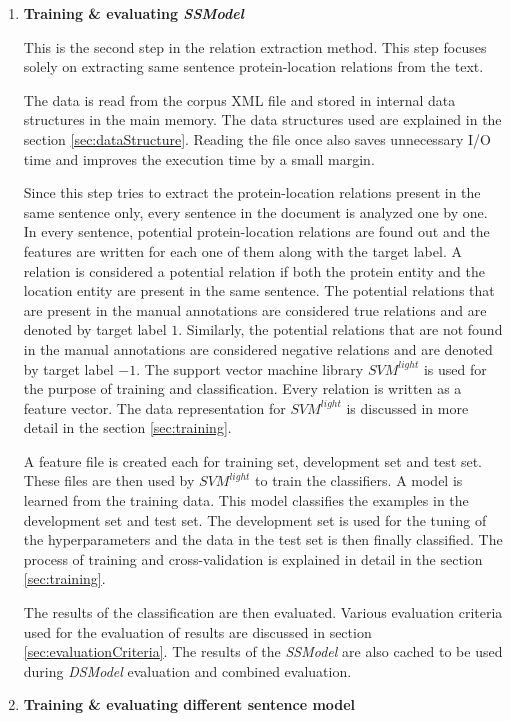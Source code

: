 \begin{enumerate}
\item \textbf{Training \& evaluating \textit{SSModel}}

This is the second step in the relation extraction method. This step focuses solely on extracting same sentence protein-location relations from the text. 

The data is read from the corpus XML file and stored in internal data structures in the main memory. The data structures used are explained in the section \ref{sec:dataStructure}. Reading the file once also saves unnecessary I/O time and improves the execution time by a small margin. 

Since this step tries to extract the protein-location relations present in the same sentence only, every sentence in the document is analyzed one by one. In every sentence, potential protein-location relations are found out and the features are written for each one of them along with the target label. A relation is considered a potential relation if both the protein entity and the location entity are present in the same sentence. The potential relations that are present in the manual annotations are considered true relations and are denoted by target label $1$. Similarly, the potential relations that are not found in the manual annotations are considered negative relations and are denoted by target label $-1$. The support vector machine library $SVM^{light}$ \cite{joachims1999making} is used for the purpose of training and classification. Every relation is written as a feature vector. The data representation for $SVM^{light}$ is discussed in more detail in the section \ref{sec:training}.

A feature file is created each for training set, development set and test set. These files are then used by $SVM^{light}$ to train the classifiers. A model is learned from the training data. This model classifies the examples in the development set and test set. The development set is used for the tuning of the hyperparameters and the data in the test set is then finally classified. The process of training and cross-validation is explained in detail in the section \ref{sec:training}. 

The results of the classification are then evaluated. Various evaluation criteria used for the evaluation of results are discussed in section \ref{sec:evaluationCriteria}. The results of the \textit{SSModel} are also cached to be used during \textit{DSModel} evaluation and combined evaluation.

\item \textbf{Training \& evaluating different sentence model}


\end{enumerate}
